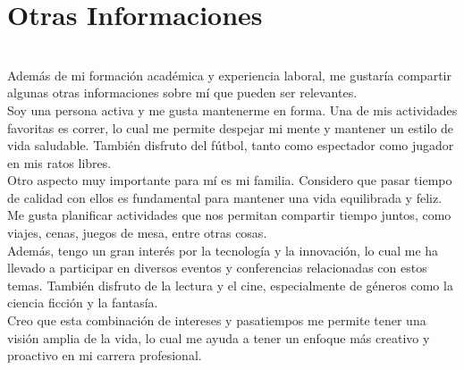 \documentclass[letterpaper]{twentyonesecondcv} %
\begin{document}
{	\section{Otras Informaciones}
	\\
	\noindent Además de mi formación académica y experiencia laboral, me gustaría compartir algunas otras informaciones sobre mí que pueden ser relevantes. \\ 	
	
	Soy una persona activa y me gusta mantenerme en forma. Una de mis actividades favoritas es correr, lo cual me permite despejar mi mente y mantener un estilo de vida saludable. También disfruto del fútbol, tanto como espectador como jugador en mis ratos libres. \\ 
		
	Otro aspecto muy importante para mí es mi familia. Considero que pasar tiempo de calidad con ellos es fundamental para mantener una vida equilibrada y feliz. Me gusta planificar actividades que nos permitan compartir tiempo juntos, como viajes, cenas, juegos de mesa, entre otras cosas. \\	
	
	Además, tengo un gran interés por la tecnología y la innovación, lo cual me ha llevado a participar en diversos eventos y conferencias relacionadas con estos temas. También disfruto de la lectura y el cine, especialmente de géneros como la ciencia ficción y la fantasía.\\ 	
	
	Creo que esta combinación de intereses y pasatiempos me permite tener una visión amplia de la vida, lo cual me ayuda a tener un enfoque más creativo y proactivo en mi carrera profesional.
    
}
\end{document}
